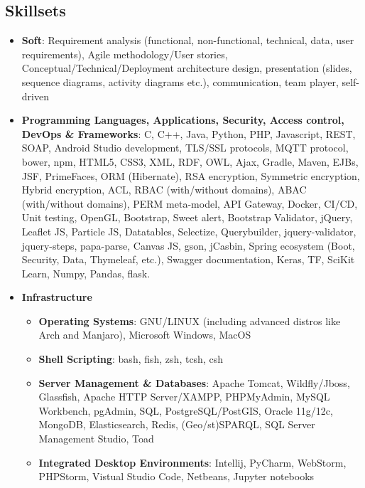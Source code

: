 \documentclass[a4paper,oneside,10pt]{article}
\begin{document}
\subsection*{Skillsets}

	\begin{itemize}

		\item \textbf{Soft}: Requirement analysis (functional, non-functional, technical, data, user requirements), Agile methodology/User stories, Conceptual/Technical/Deployment architecture design, presentation (slides, sequence diagrams, activity diagrams etc.), communication, team player, self-driven

		\item \textbf{Programming Languages, Applications, Security, Access control, DevOps \& Frameworks}: C, C++, Java, Python, PHP, Javascript, REST, SOAP, Android Studio development, TLS/SSL protocols, MQTT protocol, bower, npm, HTML5, CSS3, XML, RDF, OWL, Ajax, Gradle, Maven, EJBs, JSF, PrimeFaces, ORM (Hibernate), RSA encryption, Symmetric encryption, Hybrid encryption, ACL, RBAC (with/without domains), ABAC (with/without domains), PERM meta-model, API Gateway, Docker, CI/CD, Unit testing, OpenGL, Bootstrap, Sweet alert, Bootstrap Validator, jQuery, Leaflet JS, Particle JS, Datatables, Selectize, Querybuilder, jquery-validator, jquery-steps, papa-parse, Canvas JS, gson, jCasbin, Spring ecosystem (Boot, Security, Data, Thymeleaf, etc.), Swagger documentation, Keras, TF, SciKit Learn, Numpy, Pandas, flask.

		\item \textbf{Infrastructure} 

			\begin{itemize}
				\item \textbf{Operating Systems}: GNU/LINUX (including advanced distros like Arch and Manjaro), Microsoft Windows, MacOS 

				\item \textbf{Shell Scripting}: bash, fish, zsh, tcsh, csh

				\item \textbf{Server Management \& Databases}: Apache Tomcat, Wildfly/Jboss, Glassfish, Apache HTTP Server/XAMPP, PHPMyAdmin, MySQL Workbench, pgAdmin, SQL, PostgreSQL/PostGIS, Oracle 11g/12c, MongoDB, Elasticsearch, Redis, (Geo/st)SPARQL, SQL Server Management Studio, Toad

				\item \textbf{Integrated Desktop Environments}: Intellij, PyCharm, WebStorm, PHPStorm, Vistual Studio Code, Netbeans, Jupyter notebooks


\end{itemize}
\end{itemize}
\end{document}
